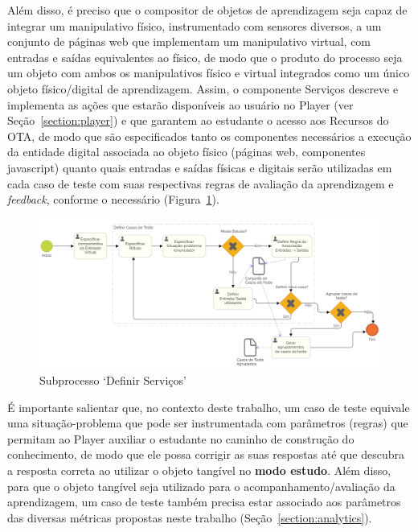 Além disso, é preciso que o compositor de objetos de aprendizagem seja capaz de integrar um manipulativo físico, instrumentado com sensores diversos, a um conjunto de páginas web que implementam um manipulativo virtual, com entradas e saídas equivalentes ao físico, de modo que o produto do processo seja um objeto com ambos os manipulativos físico e virtual integrados como um único objeto físico/digital de aprendizagem. Assim, o componente Serviços descreve e implementa as ações que estarão disponíveis ao usuário no Player (ver Seção~\ref{section:player}) e que garantem ao estudante o acesso aos Recursos do OTA, de modo que são especificados tanto os componentes necessários a execução da entidade digital associada ao objeto físico (páginas web, componentes javascript) quanto quais entradas e saídas físicas e digitais serão utilizadas em cada caso de teste com suas respectivas regras de avaliação da aprendizagem e \textit{feedback}, conforme o necessário (Figura~\ref{fig:bpmn_ofva_casos}).

\begin{figure}[htb]
	\centering
	\includegraphics[width=0.9\linewidth]{chapters/proposedMethod/bpmn_servicos.png}
	\caption{Subprocesso `Definir Serviços'}
	\label{fig:bpmn_ofva_casos}
\end{figure}

É importante salientar que, no contexto deste trabalho, um caso de teste equivale uma situação-problema que pode ser instrumentada com parâmetros (regras) que permitam ao Player auxiliar o estudante no caminho de construção do conhecimento, de modo que ele possa corrigir as suas respostas até que descubra a resposta correta ao utilizar o objeto tangível no \textbf{modo estudo}. Além disso, para que o objeto tangível seja utilizado para o acompanhamento/avaliação da aprendizagem, um caso de teste também precisa estar associado aos parâmetros das diversas métricas propostas neste trabalho (Seção~\ref{section:analytics}).


